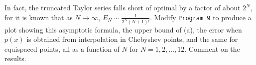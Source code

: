 In fact, the truncated Taylor series falls short of optimal by a factor of about $2^N$, for it is known that as 
$N \to \infty$, $E_N \sim \frac{1}{2^N (N+1)!}$. Modify \texttt{Program 9} to produce a plot showing this asymptotic 
formula, the upper bound of (a), the error when $p(x)$ is obtained from interpolation in Chebyshev points, and the same
for equispaced points, all as a function of $N$ for $N = 1, 2, \ldots, 12$. Comment on the results.

\begin{solution}
  \ \\
  \vfill
\end{solution}
